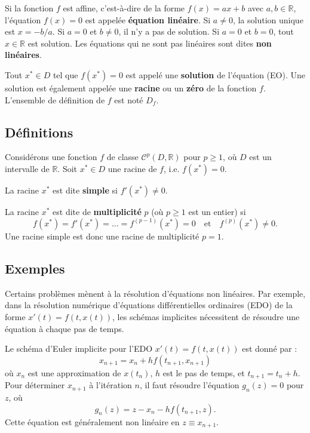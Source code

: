 \begin{definition}
Si la fonction $f$ est affine, c'est-à-dire de la forme $f(x) = ax+b$ avec $a, b \in \mathbb{R}$, l'équation $f(x)=0$ est appelée \textbf{équation linéaire}. Si $a \neq 0$, la solution unique est $x = -b/a$. Si $a=0$ et $b \neq 0$, il n'y a pas de solution. Si $a=0$ et $b=0$, tout $x \in \mathbb{R}$ est solution.
Les équations qui ne sont pas linéaires sont dites \textbf{non linéaires}.
\end{definition}

\begin{definition}
Tout $x^* \in D$ tel que $f(x^*)=0$ est appelé une \textbf{solution} de l'équation (EO). Une solution est également appelée une \textbf{racine} ou un \textbf{zéro} de la fonction $f$. L'ensemble de définition de $f$ est noté $D_f$.
\end{definition}

\subsection{Définitions}
Considérons une fonction $f$ de classe $\mathcal{C}^p(D, \mathbb{R})$ pour $p \ge 1$, où $D$ est un intervalle de $\mathbb{R}$. Soit $x^* \in D$ une racine de $f$, i.e. $f(x^*)=0$.

\begin{definition}
La racine $x^*$ est dite \textbf{simple} si $f'(x^*) \neq 0$.
\end{definition}

\begin{definition}
La racine $x^*$ est dite de \textbf{multiplicité} $p$ (où $p \ge 1$ est un entier) si
\[ f(x^*) = f'(x^*) = \dots = f^{(p-1)}(x^*) = 0 \quad \text{et} \quad f^{(p)}(x^*) \neq 0. \]
Une racine simple est donc une racine de multiplicité $p=1$.
\end{definition}

\subsection{Exemples}
Certains problèmes mènent à la résolution d'équations non linéaires. Par exemple, dans la résolution numérique d'équations différentielles ordinaires (EDO) de la forme $x'(t) = f(t, x(t))$, les schémas implicites nécessitent de résoudre une équation à chaque pas de temps.

\begin{example}
Le schéma d'Euler implicite pour l'EDO $x'(t) = f(t, x(t))$ est donné par :
\[ x_{n+1} = x_n + h f(t_{n+1}, x_{n+1}) \]
où $x_n$ est une approximation de $x(t_n)$, $h$ est le pas de temps, et $t_{n+1} = t_n + h$.
Pour déterminer $x_{n+1}$ à l'itération $n$, il faut résoudre l'équation $g_n(z) = 0$ pour $z$, où
\[ g_n(z) = z - x_n - h f(t_{n+1}, z). \]
Cette équation est généralement non linéaire en $z \equiv x_{n+1}$.
\end{example}

